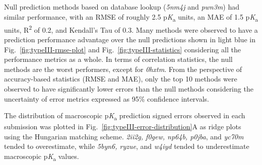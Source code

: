 \documentclass[9pt,lineno,final]{elife}
\newcommand{\pKa}{p\textit{K}\textsubscript{a}}
\begin{document}
Null prediction methods based on database lookup (\textit{5nm4j} and \textit{pwn3m}) had similar performance, with an RMSE of roughly 2.5 \pKa{} units, an MAE of 1.5 \pKa{} units, R\textsuperscript{2} of 0.2, and Kendall's Tau of 0.3.
Many methods were observed to have a prediction performance advantage over the null predictions shown in light blue in Fig.~\ref{fig:typeIII-rmse-plot} and Fig.~\ref{fig:typeIII-statistics} considering all the performance metrics as a whole.
In terms of correlation statistics, the null methods are the worst performers, except for \textit{0hxtm}.
From the perspective of accuracy-based statistics (RMSE and MAE), only the top 10 methods were observed to have significantly lower errors than the null methods considering the uncertainty of error metrics expressed as 95\% confidence intervals.

The distribution of macroscopic \pKa{} prediction signed errors observed in each submission was plotted in Fig.~\ref{fig:typeIII-error-distribution}A as ridge plots using the Hungarian matching scheme.
\textit{2ii2g, f0gew, np64b, p0jba}, and \textit{yc70m} tended to overestimate, while  \textit{
5byn6, ryzue}, and \textit{w4iyd} tended to underestimate macroscopic \pKa{} values. 
\end{document}
